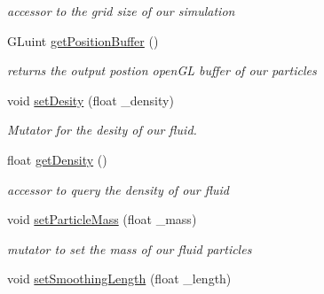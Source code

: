 \begin{DoxyCompactItemize}
\begin{DoxyCompactList}\small\item\em accessor to the grid size of our simulation \end{DoxyCompactList}\item 
\hypertarget{class_s_p_h_engine_aee51f7802e02c838732d9acab37da89a}{G\-Luint \hyperlink{class_s_p_h_engine_aee51f7802e02c838732d9acab37da89a}{get\-Position\-Buffer} ()}\label{class_s_p_h_engine_aee51f7802e02c838732d9acab37da89a}

\begin{DoxyCompactList}\small\item\em returns the output postion open\-G\-L buffer of our particles \end{DoxyCompactList}\item 
\hypertarget{class_s_p_h_engine_acbc638f7ab8fa2ab356dadf677df10c6}{void \hyperlink{class_s_p_h_engine_acbc638f7ab8fa2ab356dadf677df10c6}{set\-Desity} (float \-\_\-density)}\label{class_s_p_h_engine_acbc638f7ab8fa2ab356dadf677df10c6}

\begin{DoxyCompactList}\small\item\em Mutator for the desity of our fluid. \end{DoxyCompactList}\item 
\hypertarget{class_s_p_h_engine_a8ee29d26f9451d81a07abde5b1aa53c6}{float \hyperlink{class_s_p_h_engine_a8ee29d26f9451d81a07abde5b1aa53c6}{get\-Density} ()}\label{class_s_p_h_engine_a8ee29d26f9451d81a07abde5b1aa53c6}

\begin{DoxyCompactList}\small\item\em accessor to query the density of our fluid \end{DoxyCompactList}\item 
\hypertarget{class_s_p_h_engine_a0f937d1c09511f302455f102fae167c3}{void \hyperlink{class_s_p_h_engine_a0f937d1c09511f302455f102fae167c3}{set\-Particle\-Mass} (float \-\_\-mass)}\label{class_s_p_h_engine_a0f937d1c09511f302455f102fae167c3}

\begin{DoxyCompactList}\small\item\em mutator to set the mass of our fluid particles \end{DoxyCompactList}\item 
\hypertarget{class_s_p_h_engine_a196e04ba23d9d9c73924f3af8a8240ed}{void \hyperlink{class_s_p_h_engine_a196e04ba23d9d9c73924f3af8a8240ed}{set\-Smoothing\-Length} (float \-\_\-length)}\label{class_s_p_h_engine_a196e04ba23d9d9c73924f3af8a8240ed}


\end{DoxyCompactItemize}

